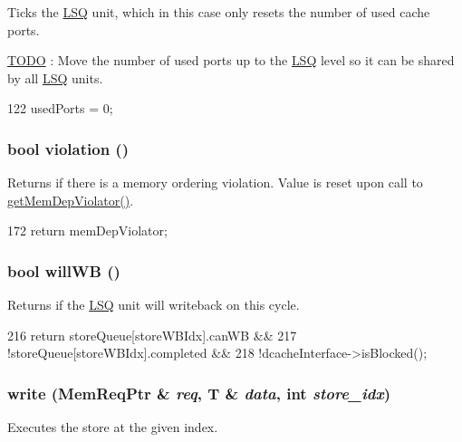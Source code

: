 \label{classOzoneLSQ_a873dd91783f9efb4a590aded1f70d6b0}
Ticks the \hyperlink{classLSQ}{LSQ} unit, which in this case only resets the number of used cache ports. \begin{Desc}
\item[\hyperlink{todo__todo000044}{TODO}]: Move the number of used ports up to the \hyperlink{classLSQ}{LSQ} level so it can be shared by all \hyperlink{classLSQ}{LSQ} units. \end{Desc}



\begin{DoxyCode}
122 { usedPorts = 0; }
\end{DoxyCode}
\hypertarget{classOzoneLSQ_a4f720bbfb5fdefdb23516500eeb0b4de}{
\subsubsection[{violation}]{\setlength{\rightskip}{0pt plus 5cm}bool violation ()}}
\label{classOzoneLSQ_a4f720bbfb5fdefdb23516500eeb0b4de}
Returns if there is a memory ordering violation. Value is reset upon call to \hyperlink{classOzoneLSQ_a30adaf6f5fb6b38b5747f35c419e3f31}{getMemDepViolator()}. 


\begin{DoxyCode}
172 { return memDepViolator; }
\end{DoxyCode}
\hypertarget{classOzoneLSQ_a338be821734603396bfef8d9fb8f04b0}{
\subsubsection[{willWB}]{\setlength{\rightskip}{0pt plus 5cm}bool willWB ()}}
\label{classOzoneLSQ_a338be821734603396bfef8d9fb8f04b0}
Returns if the \hyperlink{classLSQ}{LSQ} unit will writeback on this cycle. 


\begin{DoxyCode}
216                   { return storeQueue[storeWBIdx].canWB &&
217                         !storeQueue[storeWBIdx].completed &&
218                         !dcacheInterface->isBlocked(); }
\end{DoxyCode}
\hypertarget{classOzoneLSQ_a173162a41482ee35c5a15394b4befa4b}{
\subsubsection[{write}]{ write (MemReqPtr \& {\em req}, \/  T \& {\em data}, \/  int {\em store\_\-idx})}}
\label{classOzoneLSQ_a173162a41482ee35c5a15394b4befa4b}
Executes the store at the given index. 


